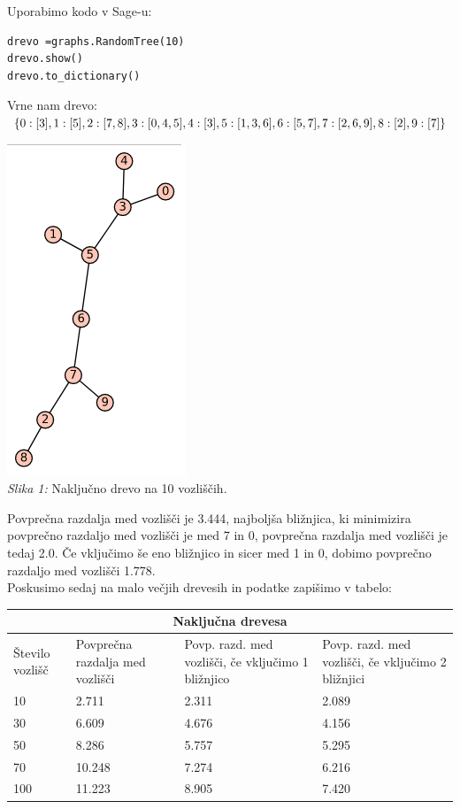 \documentclass[a4paper,10pt]{article}
\begin{document}
{Uporabimo kodo v Sage-u:
\begin{verbatim}
drevo =graphs.RandomTree(10)
drevo.show()
drevo.to_dictionary()
\end{verbatim}
Vrne nam drevo:$ \lbrace 0: [3], 1: [5], 2: [7, 8], 3: [0, 4, 5], 4: [3], \\ 5: [1, 3, 6], 6: [5, 7], 7: [2, 6, 9], 8: [2], 9: [7] \rbrace$
\begin{center}
\includegraphics[scale = 0.6]{graf1}\\ 
\scriptsize{\textit{Slika 1: } Naključno drevo na 10 vozliščih.}
\end{center}
Povprečna razdalja med vozlišči je 3.444, najboljša bližnjica, ki minimizira povprečno razdaljo med vozlišči je med 7 in 0, povprečna razdalja med vozlišči je tedaj 2.0. Če vključimo še eno bližnjico in sicer med 1 in 0, dobimo povprečno razdaljo med vozlišči 1.778.
\\[0.5cm]
Poskusimo sedaj na malo večjih drevesih in podatke zapišimo v tabelo:
\\[0.5cm]
\begin{tabular}{ |p{3cm}||p{3cm}|p{3cm}|p{3cm}|  }
 \hline
 \multicolumn{4}{|c|}{Naključna drevesa} \\
 \hline
 Število vozlišč& Povprečna razdalja med vozlišči &Povp. razd. med vozlišči, če vključimo 1 bližnjico&Povp. razd. med vozlišči, če vključimo 2 bližnjici\\
 \hline
 10   & 2.711    &2.311&   2.089\\
 30 &6.609 & 4.676& 4.156\\
 50    &8.286 & 5.757& 5.295\\
 70&10.248&7.274&6.216\\
 100&  11.223  & 8.905&7.420\\
 

\end{tabular}}
\end{document}
